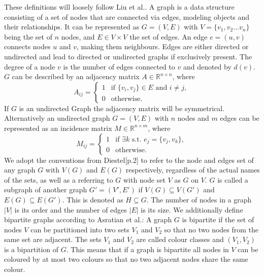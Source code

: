 These definitions will loosely follow Liu et al.\cite{Liu2020}. A graph is a data structure consisting of a set of nodes that are connected via edges, modeling objects and their relationships. It can be represented as $G=(V,E)$ with $V=\{v_1,v_2...v_n\}$ being the set of $n$ nodes, and $E \in V \times V$ the set of edges. An edge $e=(u,v)$ connects nodes $u$ and $v$, making them neighbours. Edges are either directed or undirected and lead to directed or undirected graphs if exclusively present. The degree of a node $v$ is the number of edges connected to $v$ and denoted by $d(v)$. $G$ can be described by an adjacency matrix $A \in \mathbb{R}^{n \times n}$, where
\begin{equation*}
    A_{ij}=\begin{cases}
        1 & \text{if } \{v_i,v_j\}\in E \text{ and } i \neq j, \\
        0 & \text{otherwise.}
    \end{cases}
\end{equation*}
If $G$ is an undirected Graph the adjacency matrix will be symmetrical. \\
Alternatively an undirected graph $ G=(V, E)$ with $n$ nodes and $m$ edges can be represented as an incidence matrix $M \in \mathbb{R}^{n \times m}$, where
\begin{equation*}
    M_{ij}=\begin{cases}
        1 & \text{if } \exists k \text{ s.t. } e_j = \{v_j, v_k\}, \\
        0 & \text{otherwise.}
    \end{cases}
\end{equation*}
We adopt the conventions from Diestel\cite{Diestel2017}[p.2] to refer to the node and edges set of any graph $G$ with $V(G)$ and $E(G)$ respectively, regardless of the actual names of the sets, as well as a referring to $G$ with node set $V$ as $G$ on $V$. $G$ is called a subgraph of another graph $G'=(V',E')$ if $V(G) \subseteq V(G')$ and $E(G) \subseteq E(G')$. This is denoted as $H \subseteq G$. The number of nodes in a graph $|V|$ is its order and the number of edges $|E|$ is its size.
We additionally define bipartite graphs according to Asratian et al.\cite{asratian1998}: A graph $G$ is bipartite if the set of nodes $V$ can be partitioned into two sets $V_1$ and $V_2$ so that no two nodes from the same set are adjacent. The sets $V_1$ and $V_2$ are called colour classes and $(V_1, V_2)$ is a bipartition of $G$. This means that if a graph is bipartite all nodes in $V$ can be coloured by at most two colours so that no two adjacent nodes share the same colour.\\
